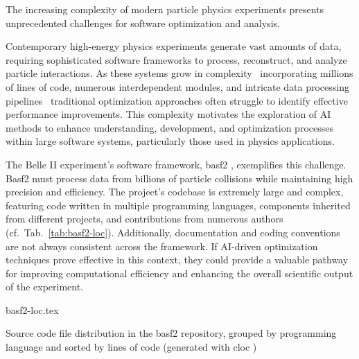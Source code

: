 The increasing complexity of modern particle physics experiments presents unprecedented challenges for software optimization and analysis.

Contemporary high-energy physics experiments generate vast amounts of data, requiring sophisticated software frameworks to process, reconstruct, and analyze particle interactions.
As these systems grow in complexity \textemdash\ incorporating millions of lines of code, numerous interdependent modules, and intricate data processing pipelines \textemdash\ traditional optimization approaches often struggle to identify effective performance improvements.
This complexity motivates the exploration of AI methods to enhance understanding, development, and optimization processes within large software systems, particularly those used in physics applications.

The Belle II experiment's software framework, basf2 \cite{basf2}\cite{basf2-paper}, exemplifies this challenge.
Basf2 must process data from billions of particle collisions while maintaining high precision and efficiency.
The project's codebase is extremely large and complex, featuring code written in multiple programming languages, components inherited from different projects, and contributions from numerous authors (cf.\ Tab.\ \ref{tab:basf2-loc}). Additionally, documentation and coding conventions are not always consistent across the framework.
If AI-driven optimization techniques prove effective in this context, they could provide a valuable pathway for improving computational efficiency and enhancing the overall scientific output of the experiment.

\begin{table}[htbp]
  \centering
  {basf2-loc.tex}
  \caption{Source code file distribution in the basf2 repository, grouped by programming language and sorted by lines of code (generated with cloc \cite{cloc})\footnotemark}
  \label{tab:basf2-loc}
\end{table}%
